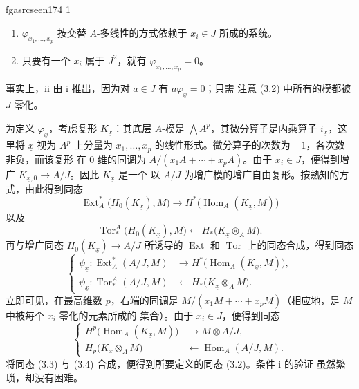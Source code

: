 \documentclass[12pt,twoside,openany]{book}
\numberwithin{equation}{section}
\newcommand{\fgaunitid}{unbound}
\newcommand{\src}[1]{%
  \phantomsection
  \hypertarget{src:\fgaunitid:#1}{}%
  \hypertarget{fga.\fgaunitid.p#1}{}%
  \ifcsname fgasrcseen#1\endcsname\else
    \expandafter\gdef\csname fgasrcseen#1\endcsname{1}%
    \hypertarget{src:#1}{}%
  \fi
  \marginpar{\raggedleft\footnotesize\sffamily #1}%
}
\theoremstyle{plain}
\theoremstyle{definition}
\theoremstyle{remark}
\begin{document}
\src{174}
\begin{enumerate}
\item[\textup{i.}] $\varphi_{x_1,\ldots,x_p}$ 按交替 $A$-多线性的方式依赖于
$x_i\in J$ 所成的系统。
\item[\textup{ii.}] 只要有一个 $x_i$ 属于 $J^{2}$，就有
$\varphi_{x_1,\ldots,x_p}=0$。
\end{enumerate}
事实上，ii 由 i 推出，因为对 $a\in J$ 有 $a\varphi_{\underline{x}}=0$；只需
注意 (3.2) 中所有的模都被 $J$ 零化。

为定义 $\varphi_{\underline{x}}$，考虑复形 $K_{\underline{x}}$：其底层
$A$-模是 $\bigwedge A^{p}$，其微分算子是内乘算子
$i_{\underline{x}}$，这里将 $\underline{x}$ 视为 $A^{p}$ 上分量为
$x_1,\ldots,x_p$ 的线性形式。微分算子的次数为 $-1$，各次数非负，而该复形
在 $0$ 维的同调为 $A/(x_1A+\cdots+x_pA)$。由于 $x_i\in J$，便得到增广
$K_{\underline{x},0}\longrightarrow A/J$。因此 $K_{\underline{x}}$ 是一个
以 $A/J$ 为增广模的增广自由复形。按熟知的方式，由此得到同态
\[
\operatorname{Ext}_{A}^{*}\bigl(H_0(K_{\underline{x}}),M\bigr)
\longrightarrow
H^{*}\bigl(\operatorname{Hom}_{A}(K_{\underline{x}},M)\bigr)
\]
以及
\[
\operatorname{Tor}_{*}^{A}\bigl(H_0(K_{\underline{x}}),M\bigr)
\longleftarrow
H_{*}\bigl(K_{\underline{x}}\otimes_A M\bigr).
\]
再与增广同态 $H_0(K_{\underline{x}})\longrightarrow A/J$ 所诱导的
$\operatorname{Ext}$ 和 $\operatorname{Tor}$ 上的同态合成，得到同态
\begin{equation}\tag{3.3}
\left\{
\begin{aligned}
\psi_{\underline{x}}:
\operatorname{Ext}_{A}^{*}(A/J,M)
&\longrightarrow H^{*}\bigl(\operatorname{Hom}_{A}(K_{\underline{x}},M)\bigr),\\
\psi_{\underline{x}}:
\operatorname{Tor}_{*}^{A}(A/J,M)
&\longleftarrow H_{*}\bigl(K_{\underline{x}}\otimes_A M\bigr).
\end{aligned}
\right.
\end{equation}
立即可见，在最高维数 $p$，右端的同调是
$M/(x_1M+\cdots+x_pM)$（相应地，是 $M$ 中被每个 $x_i$ 零化的元素所成的
集合）。由于 $x_i\in J$，便得到同态
\begin{equation}\tag{3.4}
\left\{
\begin{aligned}
H^{p}\bigl(\operatorname{Hom}_{A}(K_{\underline{x}},M)\bigr)
&\longrightarrow M\otimes A/J,\\
H_{p}\bigl(K_{\underline{x}}\otimes_A M\bigr)
&\longleftarrow\operatorname{Hom}_{A}(A/J,M).
\end{aligned}
\right.
\end{equation}
将同态 (3.3) 与 (3.4) 合成，便得到所要定义的同态 (3.2)。条件 i 的验证
虽然繁琐，却没有困难。
\end{document}
